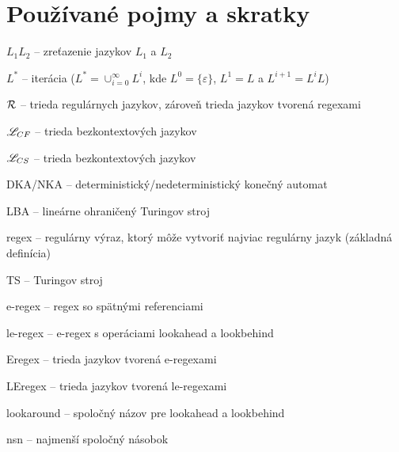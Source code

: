 \chapter*{Používané pojmy a skratky}
\label{chap:pojmy}

\begin{list}{}{}
\item $ L_{1}L_{2} $ -- zreťazenie jazykov $ L_{1} $ a $ L_{2} $
\item $ L^* $ -- iterácia ($L^*=\cup^{\infty}_{i=0}L^i$, kde $L^0=\lbrace \varepsilon \rbrace$, $L^1=L$ a $L^{i+1}=L^iL$)
\item $ {\cal R} $ -- trieda regulárnych jazykov, zároveň trieda jazykov tvorená regexami
\item $ \mathscr{L}_{CF}$ -- trieda bezkontextových jazykov
\item $ \mathscr{L}_{CS}$ -- trieda bezkontextových jazykov
\item DKA/NKA -- deterministický/nedeterministický konečný automat
\item LBA -- lineárne ohraničený Turingov stroj
\item regex -- regulárny výraz, ktorý môže vytvoriť najviac regulárny jazyk (základná definícia)
\item TS -- Turingov stroj
\item e-regex -- regex so spätnými referenciami
\item le-regex -- e-regex s operáciami lookahead a lookbehind
\item Eregex -- trieda jazykov tvorená e-regexami
\item LEregex -- trieda jazykov tvorená le-regexami
\item lookaround -- spoločný názov pre lookahead a lookbehind
\item nsn -- najmenší spoločný násobok
\end{list}

